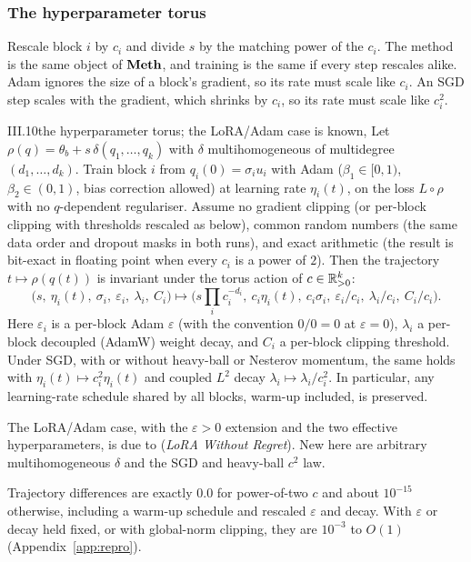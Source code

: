 \subsubsection{The hyperparameter torus}\label{sec:fibres-torus}

Rescale block $i$ by $c_i$ and divide $s$ by the matching power of the $c_i$. The method is the same object of $\mathbf{Meth}$,
and training is the same if every step rescales alike. Adam ignores the size of a block's gradient, so its rate must
scale like $c_i$. An SGD step scales with the gradient, which shrinks by $c_i$, so its rate must scale like $c_i^2$.

\begin{theorem}{III.10}{the hyperparameter torus; the LoRA/Adam case is known, \citet{schulman2025lora}}
Let $\rho(q)=\theta_b+s\,\delta(q_1,\dots,q_k)$ with $\delta$ multihomogeneous of multidegree $(d_1,\dots,d_k)$. Train
block $i$ from $q_i(0)=\sigma_iu_i$ with Adam \citep{xkingma2015adam} ($\beta_1\in[0,1)$, $\beta_2\in(0,1)$, bias
correction allowed) at learning rate $\eta_i(t)$, on the loss $L\circ\rho$ with no $q$-dependent regulariser. Assume no
gradient clipping (or per-block clipping with thresholds rescaled as below), common random numbers (the same data order
and dropout masks in both runs), and exact arithmetic (the result is bit-exact in floating point when every $c_i$ is a
power of $2$). Then the trajectory $t\mapsto\rho(q(t))$ is invariant under the torus action of $c\in\mathbb{R}_{>0}^k$:
\[\big(s,\ \eta_i(t),\ \sigma_i,\ \varepsilon_i,\ \lambda_i,\ C_i\big)\mapsto\Big(s\prod_ic_i^{-d_i},\ c_i\eta_i(t),\ c_i\sigma_i,\ \varepsilon_i/c_i,\ \lambda_i/c_i,\ C_i/c_i\Big).\]
Here $\varepsilon_i$ is a per-block Adam $\varepsilon$ (with the convention $0/0=0$ at $\varepsilon=0$), $\lambda_i$ a
per-block decoupled (AdamW) weight decay, and $C_i$ a per-block clipping threshold. Under SGD, with or without
heavy-ball or Nesterov momentum, the same holds with $\eta_i(t)\mapsto c_i^2\eta_i(t)$ and coupled $L^2$ decay
$\lambda_i\mapsto\lambda_i/c_i^2$. In particular, any learning-rate schedule shared by all blocks, warm-up included, is
preserved.
\end{theorem}

The LoRA/Adam case, with the $\varepsilon>0$ extension and the two effective hyperparameters, is due to
\citet{schulman2025lora} (\emph{LoRA Without Regret}). New here are arbitrary multihomogeneous $\delta$ and the SGD and
heavy-ball $c^2$ law.

\noindent{}\enspace Trajectory differences are exactly $0.0$ for power-of-two $c$ and about $10^{-15}$ otherwise,
including a warm-up schedule and rescaled $\varepsilon$ and decay. With $\varepsilon$ or decay held fixed, or with
global-norm clipping, they are $10^{-3}$ to $O(1)$ (Appendix~\ref{app:repro}).

